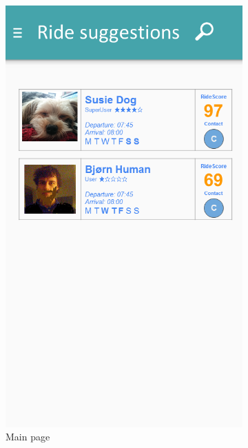 \begin{figure}[h!]
	\centering
	\begin{subfigure}[b]{0.3\textwidth}
		\includegraphics[width=\textwidth]{figures/GUI-main.png}
		\caption{Main page}
		\label{fig:GUI-main}
	\end{subfigure}
	~ %
	\begin{subfigure}[b]{0.3\textwidth}

\end{subfigure}
\end{figure}
